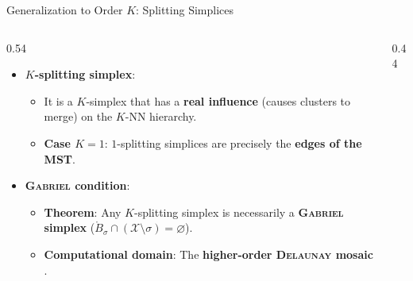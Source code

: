 \documentclass[A4,svgnames,9pt,aspectratio=169]{beamer}
\begin{document}
\begin{frame}{Generalization to Order $K$: Splitting Simplices}
    \begin{columns}[c, onlytextwidth]
        \begin{column}{0.54\textwidth}
            \begin{itemize}
                \setlength{\itemsep}{10pt}
                \item \textbf{$K$-splitting simplex}:
                \begin{itemize}
                    \item It is a $K$-simplex that has a \textbf{real influence} (causes clusters to merge) on the $K$-NN hierarchy.
                    \item \textbf{Case $K=1$}: $1$-splitting simplices are precisely the \textbf{edges of the MST}.
                \end{itemize}
                \item \textbf{\textsc{Gabriel} condition}:
                \begin{itemize}
                    \item \textbf{Theorem}: Any $K$-splitting simplex is necessarily a \textbf{\textsc{Gabriel} simplex} ($\mathring{B}_\sigma \cap (\mathcal{X} \setminus \sigma) = \varnothing$).
                    \item \textbf{Computational domain}: The \textbf{higher-order \textsc{Delaunay} mosaic} \cite{osangEdelsbrunner2023algorithm}.
                \end{itemize}
            \end{itemize}
        \end{column}
        
        \begin{column}{0.44\textwidth}
            \begin{center}
\end{center}
\end{column}
\end{columns}
\end{frame}
\end{document}

